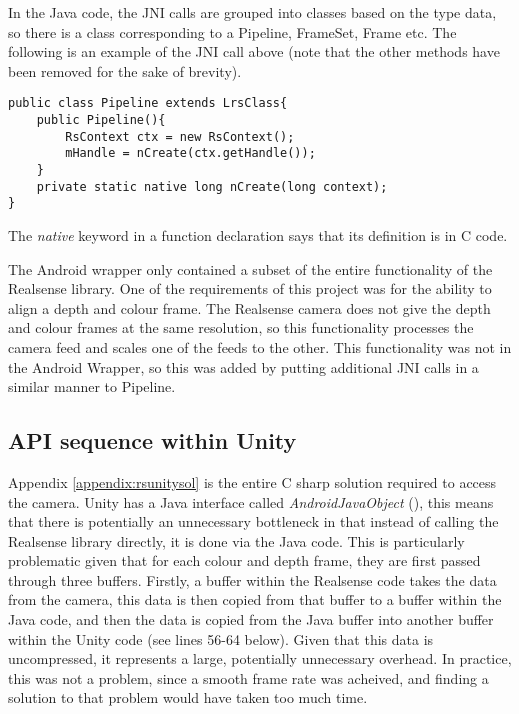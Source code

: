    In the Java code, the JNI calls are grouped into classes based on the type data, so there is a class corresponding to a Pipeline, FrameSet, Frame etc. The following is an example of the JNI call above (note that the other methods have been removed for the sake of brevity).

    \begin{lstlisting}[style=CSharpStyle]
public class Pipeline extends LrsClass{
    public Pipeline(){
        RsContext ctx = new RsContext();
        mHandle = nCreate(ctx.getHandle());
    }
    private static native long nCreate(long context);
}\end{lstlisting}

    The {\slshape native} keyword in a function declaration says that its definition is in C code.

    The Android wrapper only contained a subset of the entire functionality of the Realsense library. One of the requirements of this project was for the ability to align a depth and colour frame. The Realsense camera does not give the depth and colour frames at the same resolution, so this functionality processes the camera feed and scales one of the feeds to the other. This functionality was not in the Android Wrapper, so this was added by putting additional JNI calls in a similar manner to Pipeline.

    \subsection{API sequence within Unity}
    Appendix \ref{appendix:rsunitysol} is the entire C sharp solution required to access the camera. Unity has a Java interface called {\slshape AndroidJavaObject} (\cite{unityandroidjavaobject}), this means that there is potentially an unnecessary bottleneck in that instead of calling the Realsense library directly, it is done via the Java code. This is particularly problematic given that for each colour and depth frame, they are first passed through three buffers. Firstly, a buffer within the Realsense code takes the data from the camera, this data is then copied from that buffer to a buffer within the Java code, and then the data is copied from the Java buffer into another buffer within the Unity code (see lines 56-64 below). Given that this data is uncompressed, it represents a large, potentially unnecessary overhead. In practice, this was not a problem, since a smooth frame rate was acheived, and finding a solution to that problem would have taken too much time.

